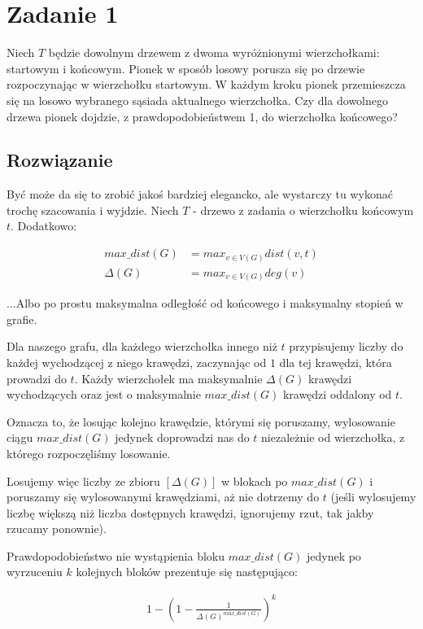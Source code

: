 \section{Zadanie 1}

Niech \(T\) będzie dowolnym drzewem z dwoma wyróżnionymi wierzchołkami: startowym i końcowym. Pionek w sposób losowy porusza się po drzewie rozpoczynając w wierzchołku startowym. W każdym kroku pionek przemieszcza się na losowo wybranego sąsiada aktualnego wierzchołka. Czy dla dowolnego drzewa pionek dojdzie, z prawdopodobieństwem 1, do wierzchołka końcowego?

\subsection*{Rozwiązanie}
Być może da się to zrobić jakoś bardziej elegancko, ale wystarczy tu wykonać trochę szacowania i wyjdzie. Niech \(T\) - drzewo z zadania o wierzchołku końcowym \(t\). Dodatkowo:

\begin{align*}
	max\_dist(G) & = max_{v \in V(G)}dist(v, t) \\
	\Delta(G)    & = max_{v \in V(G)}deg(v)
\end{align*}

...Albo po prostu maksymalna odległość od końcowego i maksymalny stopień w grafie.

Dla naszego grafu, dla każdego wierzchołka innego niż \(t\) przypisujemy liczby do każdej wychodzącej z niego krawędzi, zaczynając od \(1\) dla tej krawędzi, która prowadzi do \(t\). Każdy wierzchołek ma maksymalnie \(\Delta(G)\) krawędzi wychodzących oraz jest o maksymalnie \(max\_dist(G)\) krawędzi oddalony od \(t\).

Oznacza to, że losując kolejno krawędzie, którymi się poruszamy, wylosowanie ciągu \(max\_dist(G)\) jedynek doprowadzi nas do \(t\) niezależnie od wierzchołka, z którego rozpoczęliśmy losowanie.

Losujemy więc liczby ze zbioru \([\Delta(G)]\) w blokach po \(max\_dist(G)\) i poruszamy się wylosowanymi krawędziami, aż nie dotrzemy do \(t\) (jeśli wylosujemy liczbę większą niż liczba dostępnych krawędzi, ignorujemy rzut, tak jakby rzucamy ponownie).

Prawdopodobieństwo nie wystąpienia bloku \(max\_dist(G)\) jedynek po wyrzuceniu \(k\) kolejnych bloków prezentuje się następująco:

\begin{align*}
	1 - \left(1 - \frac 1 {\Delta(G)^{max\_dist(G)}}\right)^k
\end{align*}

